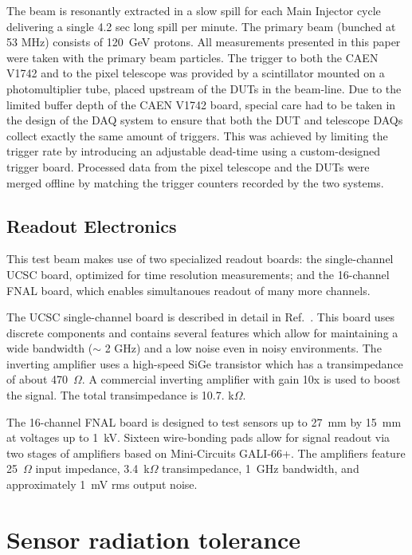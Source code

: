 \documentclass[preprint,1p]{elsarticle}
\begin{document}
The beam is resonantly extracted in a slow spill for each Main Injector cycle
delivering a single 4.2 sec long spill per minute. The primary beam (bunched at
53 MHz) consists of 120~GeV protons. All measurements presented in this paper
were taken with the primary beam particles. The trigger to both the CAEN V1742
and to the pixel telescope was provided by a scintillator mounted on a
photomultiplier tube, placed upstream of the DUTs in the beam-line. Due to the
limited buffer depth of the CAEN V1742 board, special care had to be taken in
the design of the DAQ system to ensure that both the DUT and telescope DAQs
collect exactly the same amount of triggers. This was achieved by limiting the
trigger rate by introducing an adjustable dead-time using a custom-designed
trigger board. Processed data from the pixel telescope and the DUTs were
merged offline by matching the trigger counters recorded by the two systems.

\subsection{Readout Electronics}
This test beam makes use of two specialized readout boards: the single-channel UCSC board, optimized for time resolution measurements; and the 16-channel FNAL board, which enables simultanoues readout of many more channels.

The UCSC single-channel board is described in detail in
Ref.~\cite{Cartiglia201783}. This board uses discrete components and contains
several features which allow for maintaining a wide bandwidth ($\sim$ 2 GHz) and a
low noise even in noisy environments. The inverting amplifier uses a high-speed
SiGe transistor which has a transimpedance of about 470~$\Omega$. A commercial
inverting amplifier with gain 10x is used to boost the signal. The total transimpedance is 10.7.
k$\Omega$.

The 16-channel FNAL board is designed to test sensors up to 27~mm
by 15~mm at voltages up to 1~kV. Sixteen wire-bonding pads allow for signal readout via two stages of amplifiers based on Mini-Circuits GALI-66+. The amplifiers feature 25~$\Omega$ input impedance, 3.4~k$\Omega$ transimpedance, 1~GHz bandwidth, and approximately 1~mV rms output noise.

\section{Sensor radiation tolerance}
\label{sec:irradiationStudies}
\end{document}
